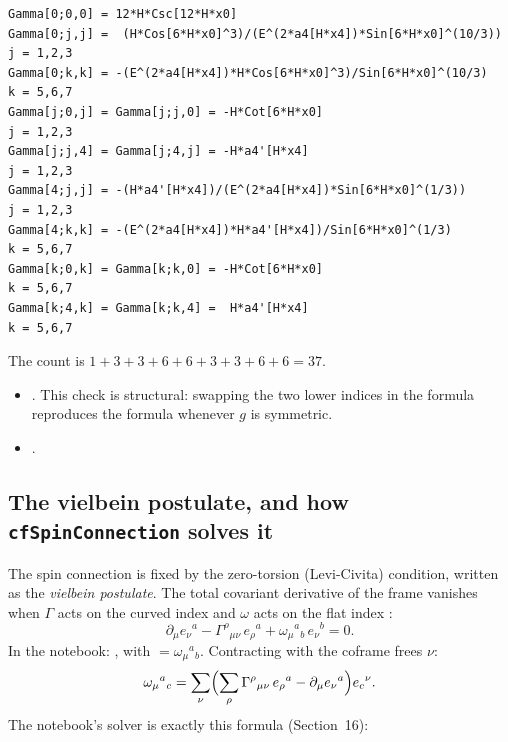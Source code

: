 {\scriptsize
\begin{verbatim}
Gamma[0;0,0] = 12*H*Csc[12*H*x0]
Gamma[0;j,j] =  (H*Cos[6*H*x0]^3)/(E^(2*a4[H*x4])*Sin[6*H*x0]^(10/3))   j = 1,2,3
Gamma[0;k,k] = -(E^(2*a4[H*x4])*H*Cos[6*H*x0]^3)/Sin[6*H*x0]^(10/3)      k = 5,6,7
Gamma[j;0,j] = Gamma[j;j,0] = -H*Cot[6*H*x0]                             j = 1,2,3
Gamma[j;j,4] = Gamma[j;4,j] = -H*a4'[H*x4]                               j = 1,2,3
Gamma[4;j,j] = -(H*a4'[H*x4])/(E^(2*a4[H*x4])*Sin[6*H*x0]^(1/3))         j = 1,2,3
Gamma[4;k,k] = -(E^(2*a4[H*x4])*H*a4'[H*x4])/Sin[6*H*x0]^(1/3)           k = 5,6,7
Gamma[k;0,k] = Gamma[k;k,0] = -H*Cot[6*H*x0]                             k = 5,6,7
Gamma[k;4,k] = Gamma[k;k,4] =  H*a4'[H*x4]                               k = 5,6,7
\end{verbatim}
}
\noindent The count is $1+3+3+6+6+3+3+6+6=37$.
\begin{itemize}
  \item {} . This check is structural: swapping the two lower indices in the formula reproduces the formula whenever $g$ is symmetric.
  \item {} .
\end{itemize}

\subsection{The vielbein postulate, and how \texorpdfstring{\texttt{cfSpinConnection}}{cfSpinConnection} solves it}
\label{csc:postulate}\label{sec:6.5}

The spin connection is fixed by the zero-torsion (Levi-Civita) condition, written as the
\emph{vielbein postulate}. The total covariant derivative of the frame vanishes when $\Gamma$ acts
on the curved index and $\omega$ acts on the flat index :
\begin{equation}
  \partial_\mu e_\nu{}^a-\Gamma^\rho{}_{\mu\nu}\,e_\rho{}^a+\omega_\mu{}^a{}_b\,e_\nu{}^b=0 .
\end{equation}
In the notebook: ,
with  $=\omega_\mu{}^a{}_b$. Contracting with the coframe frees $\nu$:
\begin{equation}
  \omega_\mu{}^a{}_c=\sum_\nu\Bigl(\sum_\rho\Gamma^\rho{}_{\mu\nu}\,e_\rho{}^a-\partial_\mu e_\nu{}^a\Bigr)e_c{}^\nu .
\end{equation}
The notebook's solver is exactly this formula (Section~16):

